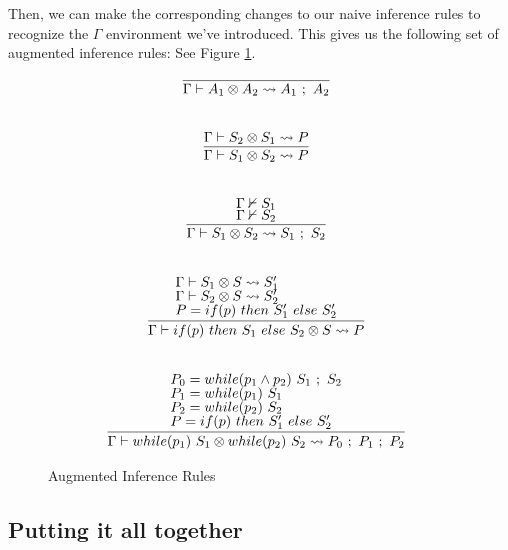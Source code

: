 \documentclass[letterpaper,twocolumn,10pt]{article}
\newcommand{\cross}{\otimes{}}
\begin{document}
Then, we can make the corresponding changes to our naive inference rules to recognize the $\Gamma$ environment we've introduced. This gives us the following set of augmented inference rules: See Figure \ref{fig:auginfrules2}.

\begin{figure}
    \caption{Augmented Inference Rules}
    \label{fig:auginfrules2}
    \[
		\begin{array}{c}
			\infer[]{\Gamma \vdash A_1 \cross A_2 \leadsto A_1\ ;\ A_2}{} \\ \\ \\
			\infer[]{\Gamma \vdash S_1 \cross S_2 \leadsto P}{
				\Gamma \vdash S_2 \cross S_1 \leadsto P
			} \\ \\ \\
			\infer[]{\Gamma \vdash S_1 \cross S_2 \leadsto S_1\ ;\ S_2}{
				\Gamma \nvdash S_1 \\
				\Gamma \nvdash S_2
			} \\ \\ \\
			\infer[]{\Gamma \vdash if(p)\ then\ S_1\ else\ S_2 \cross S \leadsto P}{
				\text{$\Gamma \vdash S_1 \cross S \leadsto S_1'$} \\
				\text{$\Gamma \vdash S_2 \cross S \leadsto S_2'$} \\
				\text{$P = if(p)\ then\ S_1'\ else\ S_2'$}
			} \\ \\ \\
			\infer[]{\Gamma \vdash while(p_1)\ S_1 \cross while(p_2)\ S_2 \leadsto P_0\ ;\ P_1\ ;\ P_2}{
				\text{$P_0 = while(p_1 \land p_2)\ S_1\ ;\ S_2$} \\
				\text{$P_1 = while(p_1)\ S_1$} \\
				\text{$P_2 = while(p_2)\ S_2$} \\
				\text{$P = if(p)\ then\ S_1'\ else\ S_2'$}
			}
		\end{array}
    \]
\end{figure}


\subsection{Putting it all together}
\label{sec:all-together}
\end{document}
